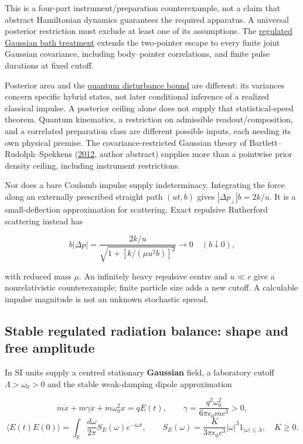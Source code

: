 \documentclass[11pt,a4paper]{article}
\begin{document}
This is a four-part instrument/preparation counterexample, not a claim
that abstract Hamiltonian dynamics guarantees the required apparatus. A
universal posterior restriction must exclude at least one of its
assumptions. The \href{sed-closure-under-recording.md}{regulated
Gaussian bath treatment} extends the two-pointer escape to every finite
joint Gaussian covariance, including body--pointer correlations, and
finite pulse durations at fixed cutoff.

Posterior area and the \href{record-distance-path-length.md}{quantum
disturbance bound} are different: its variances concern specific hybrid
states, not later conditional inference of a realized classical impulse.
A posterior ceiling alone does not supply that statistical-speed
theorem. Quantum kinematics, a restriction on admissible
readout/composition, and a correlated preparation class are different
possible inputs, each needing its own physical premise. The
covariance-restricted Gaussian theory of Bartlett--Rudolph--Spekkens
(\href{https://arxiv.org/abs/1111.5057}{2012}, author abstract) supplies
more than a pointwise prior density ceiling, including instrument
restrictions.

Nor does a bare Coulomb impulse supply indeterminacy. Integrating the
force along an externally prescribed straight path \((ut,b)\) gives
\(|\Delta p_\perp|b=2k/u\). It is a small-deflection approximation for
scattering. Exact repulsive Rutherford scattering instead has

\[b|\Delta p|=\frac{2k/u}{\sqrt{1+[k/(\mu u^2b)]^2}}\longrightarrow0
 \quad(b\downarrow0),\]

with reduced mass \(\mu\). An infinitely heavy repulsive centre and
\(u\ll c\) give a nonrelativistic counterexample; finite particle size
adds a new cutoff. A calculable impulse magnitude is not an unknown
stochastic spread.

\hypertarget{stable-regulated-radiation-balance-shape-and-free-amplitude}{%
\subsection{Stable regulated radiation balance: shape and free
amplitude}\label{stable-regulated-radiation-balance-shape-and-free-amplitude}}

In SI units supply a centred stationary \textbf{Gaussian} field, a
laboratory cutoff \(\Lambda>\omega_0>0\) and the stable weak-damping
dipole approximation

\[m\ddot x+m\gamma\dot x+m\omega_0^2x=qE(t),\qquad
\gamma=\frac{q^2\omega_0^2}{6\pi\epsilon_0mc^3}>0,\]
\[\langle E(t)E(0)\rangle=\int_{\mathbb R}\frac{d\omega}{2\pi}
 S_E(\omega)e^{-i\omega t},\qquad
S_E(\omega)=\frac{K}{3\pi\epsilon_0c^3}|\omega|^3
 1_{|\omega|\le\Lambda},\quad K\ge0.\]
\end{document}
